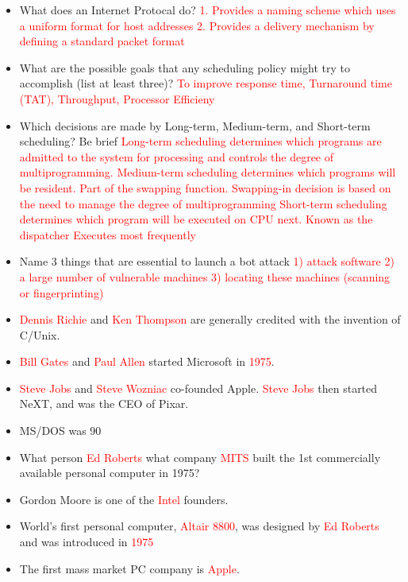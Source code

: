 \documentclass[9pt,landscape]{memoir}
\newcommand{\answer}[1]{\textcolor{red}{#1}}
\begin{document}
\begin{multicols}{6}
\begin{itemize}
    \item What does an Internet Protocal do?  \answer{1. Provides a naming scheme which uses a uniform format for host addresses 2. Provides a delivery mechanism by defining a standard packet format}
    \item What are the possible goals that any scheduling policy might try to accomplish (list at least three)?  \answer{To improve response time, Turnaround time (TAT), Throughput, Processor Efficieny}
    \item Which decisions are made by Long-term, Medium-term, and Short-term scheduling? Be brief \answer{Long-term scheduling determines which programs are admitted to the system for processing and controls the degree of multiprogramming. Medium-term scheduling determines which programs will be resident. Part of the swapping function. Swapping-in decision is based on the need to manage the degree of multiprogramming Short-term scheduling determines which program will be executed on CPU next. Known as the dispatcher Executes most frequently}
    \item Name 3 things that are essential to launch a bot attack \answer{1) attack software 2) a large number of vulnerable machines 3) locating these machines (scanning or fingerprinting)}
    \item \answer{Dennis Richie} and \answer{Ken Thompson} are generally credited with the invention of C/Unix.
    \item \answer{Bill Gates} and \answer{Paul Allen} started Microsoft in \answer{1975}.
    \item \answer{Steve Jobs} and \answer{Steve Wozniac} co-founded Apple. \answer{Steve Jobs} then started NeXT, and was the CEO of Pixar.
    \item MS/DOS was 90%
    \item What person \answer{Ed Roberts} what company \answer{MITS} built the 1st commercially available personal computer in 1975?
    \item Gordon Moore is one of the \answer{Intel} founders.
    \item World's first personal computer, \answer{Altair 8800}, was designed by \answer{Ed Roberts} and was introduced in \answer{1975}
    \item The first mass market PC company is \answer{Apple}.

\end{itemize}
\end{multicols}
\end{document}
